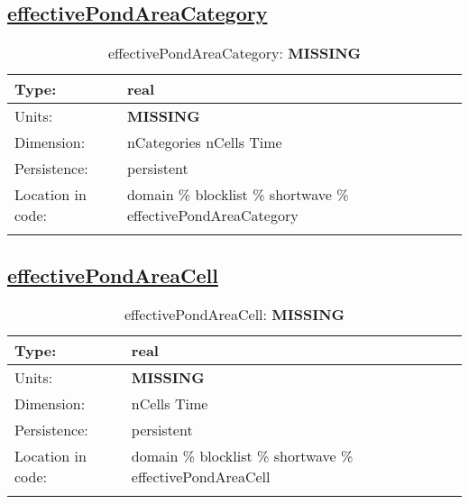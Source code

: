 \subsection[effectivePondAreaCategory]{\hyperref[sec:var_tab_shortwave]{effectivePondAreaCategory}}
\label{subsec:var_sec_shortwave_effectivePondAreaCategory}
\begin{center}
\begin{longtable}{| p{2.0in} | p{4.0in} |}
        \hline 
        Type: & real \\
        \hline 
        Units: & {\bf \color{red} MISSING} \\
        \hline 
        Dimension: & nCategories nCells Time \\
        \hline 
        Persistence: & persistent \\
        \hline 
         Location in code: & domain \% blocklist \% shortwave \% effectivePondAreaCategory \\
         \hline 
    \caption{effectivePondAreaCategory: {\bf \color{red} MISSING}}
\end{longtable}
\end{center}
\subsection[effectivePondAreaCell]{\hyperref[sec:var_tab_shortwave]{effectivePondAreaCell}}
\label{subsec:var_sec_shortwave_effectivePondAreaCell}
\begin{center}
\begin{longtable}{| p{2.0in} | p{4.0in} |}
        \hline 
        Type: & real \\
        \hline 
        Units: & {\bf \color{red} MISSING} \\
        \hline 
        Dimension: & nCells Time \\
        \hline 
        Persistence: & persistent \\
        \hline 
         Location in code: & domain \% blocklist \% shortwave \% effectivePondAreaCell \\
         \hline 
    \caption{effectivePondAreaCell: {\bf \color{red} MISSING}}
\end{longtable}
\end{center}
